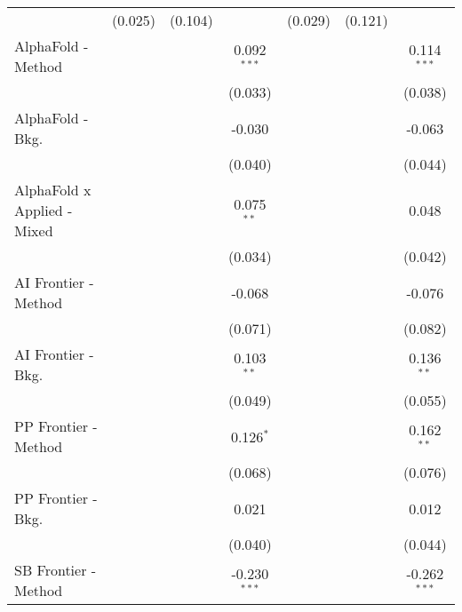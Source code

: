 \begin{tabular}{lcccccc}
                                  & (0.025)       & (0.104)      &                & (0.029)       & (0.121)      &   \\   
   AlphaFold - Method             &               &              & 0.092$^{***}$  &               &              & 0.114$^{***}$\\   
                                  &               &              & (0.033)        &               &              & (0.038)\\   
   AlphaFold - Bkg.               &               &              & -0.030         &               &              & -0.063\\   
                                  &               &              & (0.040)        &               &              & (0.044)\\   
   AlphaFold x Applied - Mixed    &               &              & 0.075$^{**}$   &               &              & 0.048\\   
                                  &               &              & (0.034)        &               &              & (0.042)\\   
   AI Frontier - Method           &               &              & -0.068         &               &              & -0.076\\   
                                  &               &              & (0.071)        &               &              & (0.082)\\   
   AI Frontier - Bkg.             &               &              & 0.103$^{**}$   &               &              & 0.136$^{**}$\\   
                                  &               &              & (0.049)        &               &              & (0.055)\\   
   PP Frontier - Method           &               &              & 0.126$^{*}$    &               &              & 0.162$^{**}$\\   
                                  &               &              & (0.068)        &               &              & (0.076)\\   
   PP Frontier - Bkg.             &               &              & 0.021          &               &              & 0.012\\   
                                  &               &              & (0.040)        &               &              & (0.044)\\   
   SB Frontier - Method           &               &              & -0.230$^{***}$ &               &              & -0.262$^{***}$\\   

\end{tabular}
